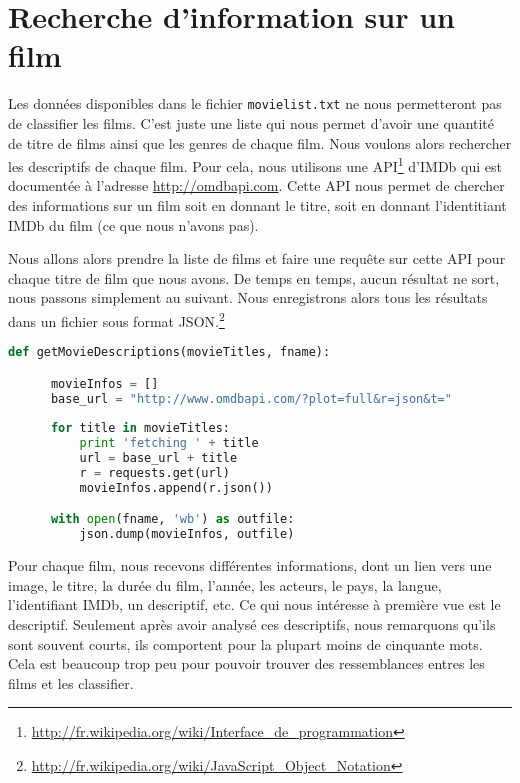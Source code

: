 \section{Recherche d'information sur un film}

Les données disponibles dans le fichier \texttt{movielist.txt} ne nous permetteront pas de classifier les films. C'est juste une liste qui nous permet d'avoir une quantité de titre de films ainsi que les genres de chaque film. Nous voulons alors rechercher les descriptifs de chaque film. Pour cela, nous utilisons une API\footnote{\url{http://fr.wikipedia.org/wiki/Interface\_de\_programmation}} d'IMDb qui est documentée à l'adresse \url{http://omdbapi.com}. Cette API nous permet de chercher des informations sur un film soit en donnant le titre, soit en donnant l'identitiant IMDb du film (ce que nous n'avons pas). 

Nous allons alors prendre la liste de films et faire une requête sur cette API pour chaque titre de film que nous avons. De temps en temps, aucun résultat ne sort, nous passons simplement au suivant. Nous enregistrons alors tous les résultats dans un fichier sous format JSON.\footnote{\url{http://fr.wikipedia.org/wiki/JavaScript\_Object\_Notation}} \\

\begin{lstlisting}[language=python]
  def getMovieDescriptions(movieTitles, fname):

      movieInfos = []
      base_url = "http://www.omdbapi.com/?plot=full&r=json&t="
    
      for title in movieTitles:
          print 'fetching ' + title
          url = base_url + title
          r = requests.get(url)
          movieInfos.append(r.json())

      with open(fname, 'wb') as outfile:
          json.dump(movieInfos, outfile)
\end{lstlisting}

Pour chaque film, nous recevons différentes informations, dont un lien vers une image, le titre, la durée du film, l'année, les acteurs, le pays, la langue, l'identifiant IMDb, un descriptif, etc. Ce qui nous intéresse à première vue est le descriptif. Seulement après avoir analysé ces descriptifs, nous remarquons qu'ils sont souvent courts, ils comportent pour la plupart moins de cinquante mots. Cela est beaucoup trop peu pour pouvoir trouver des ressemblances entres les films et les classifier. 

